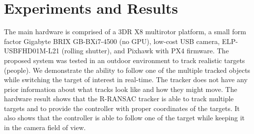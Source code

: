 \section{Experiments and Results}
The main hardware is comprised of a 3DR X8 multirotor platform, a small form factor Gigabyte BRIX GB-BXi7-4500 (no GPU), low-cost USB camera, ELP-USBFHD01M-L21 (rolling shutter), and Pixhawk with PX4 firmware. The proposed system was tested in an outdoor environment to track realistic targets (people). We demonstrate the ability to follow one of the multiple tracked objects while switching the target of interest in real-time. The tracker does not have any prior information about what tracks look like and how they might move. The hardware result shows that the R-RANSAC tracker is able to track multiple targets and to provide the controller with proper coordinates of the targets. It also shows that the controller is able to follow one of the target while keeping it in the camera field of view.
